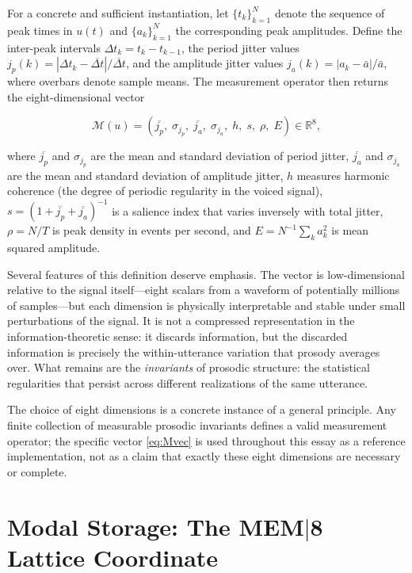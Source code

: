 \documentclass[12pt, a4paper]{article}
\begin{document}
For a concrete and sufficient instantiation, let $\{t_k\}_{k=1}^N$ denote the sequence of peak times in $u(t)$ and $\{a_k\}_{k=1}^N$ the corresponding peak amplitudes. Define the inter-peak intervals $\Delta t_k = t_k - t_{k-1}$, the period jitter values $j_p(k) = |\Delta t_k - \overline{\Delta t}| / \overline{\Delta t}$, and the amplitude jitter values $j_a(k) = |a_k - \bar{a}| / \bar{a}$, where overbars denote sample means. The measurement operator then returns the eight-dimensional vector

\begin{equation}
\mathcal{M}(u) =
\left(
\overline{j_p},\;
\sigma_{j_p},\;
\overline{j_a},\;
\sigma_{j_a},\;
h,\;
s,\;
\rho,\;
E
\right) \in \mathbb{R}^8,
\label{eq:Mvec}
\end{equation}

where $\overline{j_p}$ and $\sigma_{j_p}$ are the mean and standard deviation of period jitter, $\overline{j_a}$ and $\sigma_{j_a}$ are the mean and standard deviation of amplitude jitter, $h$ measures harmonic coherence (the degree of periodic regularity in the voiced signal), $s = (1 + \overline{j_p} + \overline{j_a})^{-1}$ is a salience index that varies inversely with total jitter, $\rho = N/T$ is peak density in events per second, and $E = N^{-1}\sum_k a_k^2$ is mean squared amplitude.

Several features of this definition deserve emphasis. The vector is low-dimensional relative to the signal itself---eight scalars from a waveform of potentially millions of samples---but each dimension is physically interpretable and stable under small perturbations of the signal. It is not a compressed representation in the information-theoretic sense: it discards information, but the discarded information is precisely the within-utterance variation that prosody averages over. What remains are the \emph{invariants} of prosodic structure: the statistical regularities that persist across different realizations of the same utterance.

The choice of eight dimensions is a concrete instance of a general principle. Any finite collection of measurable prosodic invariants defines a valid measurement operator; the specific vector \eqref{eq:Mvec} is used throughout this essay as a reference implementation, not as a claim that exactly these eight dimensions are necessary or complete.

\section{Modal Storage: The MEM$|$8 Lattice Coordinate}
\end{document}
